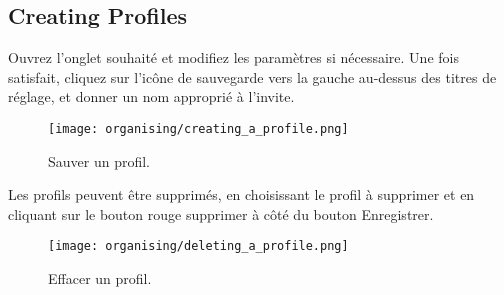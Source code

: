 \subsection{Creating Profiles} %
\label{sub:creating_profiles}

Ouvrez l'onglet souhaité et modifiez les paramètres si nécessaire. Une fois satisfait, cliquez sur l'icône de sauvegarde vers la gauche au-dessus des titres de réglage, et donner un nom approprié à l'invite.

\begin{figure}[H]
\centering
\texttt{[image: organising/creating\_a\_profile.png]}
\caption{Sauver un profil.}
\label{fig:creating_a_profile}
\end{figure}

Les profils peuvent être supprimés, en choisissant le profil à supprimer et en cliquant sur le bouton rouge supprimer à côté du bouton Enregistrer.

\begin{figure}[H]
\centering
\texttt{[image: organising/deleting\_a\_profile.png]}
\caption{Effacer un profil.}
\label{fig:deleting_a_profile}
\end{figure}



